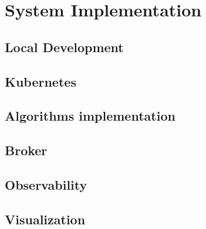 \chapter{System Implementation}

\section{Local Development}


\section{Kubernetes}


\section{Algorithms implementation}


\section{Broker}


\section{Observability}


% 

\section{Visualization}

